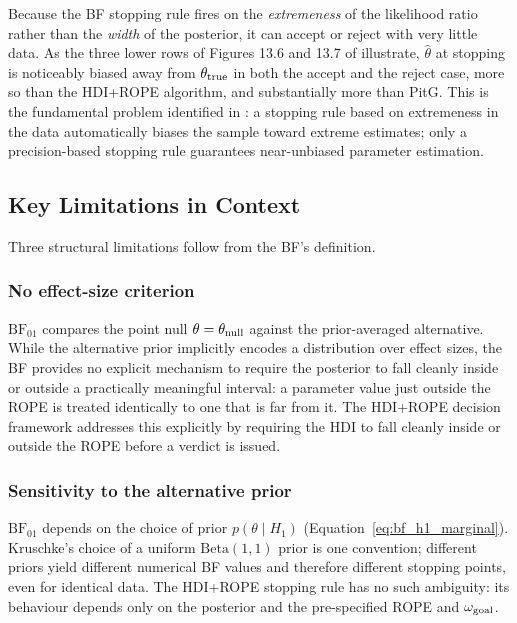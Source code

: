 Because the BF stopping rule fires on the \emph{extremeness} of the likelihood ratio
rather than the \emph{width} of the posterior, it can accept or reject with very little
data.  As the three lower rows of Figures 13.6 and 13.7 of \citet{kruschke2015doing} illustrate, $\hat{\theta}$ at stopping is noticeably
biased away from $\theta_{\rm true}$ in both the accept and the reject case, more so
than the HDI+ROPE algorithm, and substantially more than PitG.  This is the fundamental problem
identified in \citet{kruschke2015doing}: a stopping rule based on extremeness in the data
automatically biases the sample toward extreme estimates; only a precision-based stopping
rule guarantees near-unbiased parameter estimation.

\subsection*{Key Limitations in Context}

Three structural limitations follow from the BF's definition.

\subsubsection*{No effect-size criterion}

$\mathrm{BF}_{01}$ compares the point null $\theta = \theta_{\rm null}$ against the
prior-averaged alternative.  While the alternative prior implicitly encodes a distribution
over effect sizes, the BF provides no explicit mechanism to require the posterior to fall
cleanly inside or outside a practically meaningful interval: a parameter value just
outside the ROPE is treated identically to one that is far from it.  The HDI+ROPE
decision framework addresses this explicitly by requiring the HDI to fall cleanly inside
or outside the ROPE before a verdict is issued.

\subsubsection*{Sensitivity to the alternative prior}

$\mathrm{BF}_{01}$ depends on the choice of prior $p(\theta \mid H_1)$
(Equation~\ref{eq:bf_h1_marginal}).  Kruschke's choice of a uniform
$\mathrm{Beta}(1,1)$ prior is one convention; different priors yield different
numerical BF values and therefore different stopping points, even for identical data.
The HDI+ROPE stopping rule has no such ambiguity: its behaviour depends only on the
posterior and the pre-specified ROPE and $\omega_{\rm goal}$.


